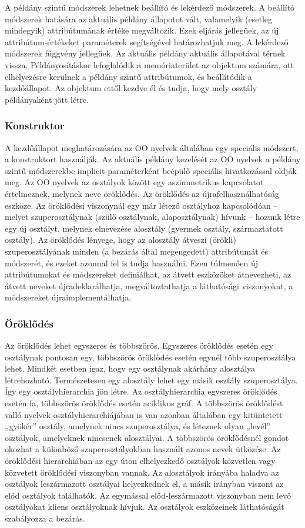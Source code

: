 A példány szintű módszerek lehetnek beállító és lekérdező módszerek. A beállító módszerek hatására az aktuális példány állapotot vált, valamelyik (esetleg mindegyik) attribútumának értéke megváltozik. Ezek eljárás jellegűek, az új attribútum-értékeket paraméterek segítségével határozhatjuk meg. A lekérdező módszerek függvény jellegűek. Az aktuális példány aktuális állapotával térnek vissza. Példányosításkor lefoglalódik a memóriaterület az objektum számára, ott elhelyezésre kerülnek a példány szintű attribútumok, és beállítódik a kezdőállapot. Az objektum ettől kezdve él és tudja, hogy mely osztály példányaként jött létre.

\subsubsection{Konstruktor}
A kezdőállapot meghatározására az OO nyelvek általában egy speciális módszert, a konstruktort használják. Az aktuális példány kezelését az OO nyelvek a példány szintű módszerekbe implicit paraméterként beépülő speciális hivatkozással oldják meg.
Az OO nyelvek az osztályok között egy aszimmetrikus kapcsolatot értelmeznek, melynek neve öröklődés. Az öröklődés az újrafelhasználhatóság eszköze. Az öröklődési viszonynál egy már létező osztályhoz kapcsolódóan -- melyet szuperosztálynak (szülő osztálynak, alaposztálynak) hívunk -- hozunk létre egy új osztályt, melynek elnevezése alosztály (gyermek osztály, származtatott osztály). Az öröklődés lényege, hogy az alosztály átveszi (örökli) szuperosztályának minden (a bezárás által megengedett) attribútumát és módszerét, és ezeket azonnal fel is tudja használni. Ezen túlmenően új attribútumokat és módszereket definiálhat, az átvett eszközöket átnevezheti, az átvett neveket újradeklarálhatja, megváltoztathatja a láthatósági viszonyokat, a módszereket újraimplementálhatja. 

\subsubsection{Öröklődés}
Az öröklődés lehet egyszeres és többszörös. Egyszeres öröklődés esetén egy osztálynak pontosan egy, többszörös öröklődés esetén egynél több szuperosztálya lehet. Mindkét esetben igaz, hogy egy osztálynak akárhány alosztálya létrehozható. Természetesen egy alosztály lehet egy másik osztály szuperosztálya. Így egy osztályhierarchia jön létre. Az osztályhierarchia egyszeres öröklődés esetén fa, többszörös öröklődés esetén aciklikus gráf. A többszörös öröklődést valló nyelvek osztályhierarchiájában is van azonban általában egy kitüntetett „gyökér” osztály, amelynek nincs szuperosztálya, és léteznek olyan „levél” osztályok, amelyeknek nincsenek alosztályai.
A többszörös öröklődésnél gondot okozhat a különböző szuperosztályokban használt azonos nevek ütközése. Az öröklődési hierarchiában az egy úton elhelyezkedő osztályok közvetlen vagy közvetett öröklődési viszonyban vannak. Az alosztályok irányába haladva az osztályok leszármazott osztályai helyezkednek el, a másik irányban viszont az előd osztályok találhatók. Az egymással előd-leszármazott viszonyban nem levő osztályokat kliens osztályoknak hívjuk. Az osztályok eszközeinek láthatóságát szabályozza a bezárás.

